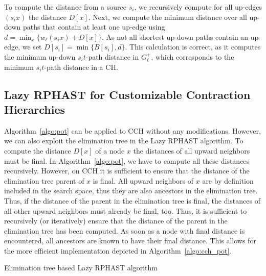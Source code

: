 \documentclass[manuscript,review]{acmart}
\begin{document}
To compute the distance from a source $s_i$, we recursively compute for all up-edges $(s_i x)$ the distance $D[x]$.
Next, we compute the minimum distance over all up-down paths that contain at least one up-edge using $d = \min_x\{w_\ell(s_i x) + D[x]\}$.
As not all shortest up-down paths contain an up-edge, we set $D[s_i] = \min \{ B[s_i], d \}$.
This calculation is correct, as it computes the minimum up-down $s_it$-path distance in $G^+_\ell$, which corresponds to the minimum $s_it$-path distance in a CH.

\subsection{Lazy RPHAST for Customizable Contraction Hierarchies}

Algorithm~\ref{algo:pot} can be applied to CCH without any modifications.
However, we can also exploit the elimination tree in the Lazy RPHAST algorithm.
To compute the distance $D[x]$ of a node $x$ the distances of all upward neighbors must be final.
In Algorithm~\ref{algo:pot}, we have to compute all these distances recursively.
However, on CCH it is sufficient to ensure that the distance of the elimination tree parent of $x$ is final.
All upward neighbors of $x$ are by definition included in the search space, thus they are also ancestors in the elimination tree.
Thus, if the distance of the parent in the elimination tree is final, the distances of all other upward neighbors must already be final, too.
Thus, it is sufficient to recursively (or iteratively) ensure that the distance of the parent in the elimination tree has been computed.
As soon as a node with final distance is encountered, all ancestors are known to have their final distance.
This allows for the more efficient implementation depicted in Algorithm~\ref{algo:cch_pot}.

\begin{algorithm2e}
\caption{Elimination tree based Lazy RPHAST algorithm}
\label{algo:cch_pot}
\end{algorithm2e}
\end{document}
